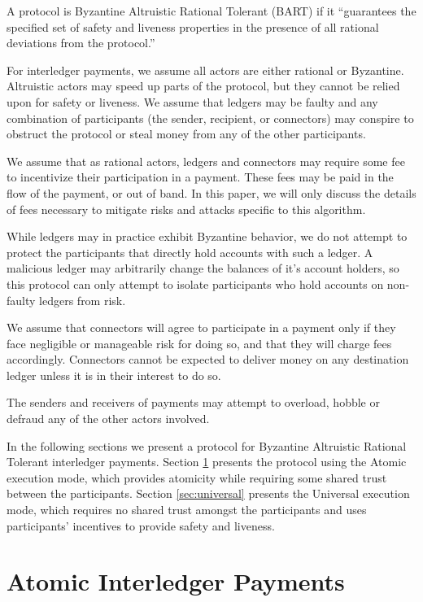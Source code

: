 \documentclass[letterpaper,twocolumn,10pt]{article}
\begin{document}
A protocol is Byzantine Altruistic Rational Tolerant (BART) if it ``guarantees the specified set of safety and liveness properties in the presence of all rational deviations from the protocol.''\cite[p. 2]{aiyer2005bar}

For interledger payments, we assume all actors are either rational or Byzantine. Altruistic actors may speed up parts of the protocol, but they cannot be relied upon for safety or liveness. We assume that ledgers may be faulty and any combination of participants (the sender, recipient, or connectors) may conspire to obstruct the protocol or steal money from any of the other participants. 

We assume that as rational actors, ledgers and connectors may require some fee to incentivize their participation in a payment. These fees may be paid in the flow of the payment, or out of band. In this paper, we will only discuss the details of fees necessary to mitigate risks and attacks specific to this algorithm.

While ledgers may in practice exhibit Byzantine behavior, we do not attempt to protect the participants that directly hold accounts with such a ledger. A malicious ledger may arbitrarily change the balances of it's account holders, so this protocol can only attempt to isolate participants who hold accounts on non-faulty ledgers from risk.

We assume that connectors will agree to participate in a payment only if they face negligible or manageable risk for doing so, and that they will charge fees accordingly. Connectors cannot be expected to deliver money on any destination ledger unless it is in their interest to do so.

The senders and receivers of payments may attempt to overload, hobble or defraud any of the other actors involved.

In the following sections we present a protocol for Byzantine Altruistic Rational Tolerant interledger payments. Section \ref{sec:atomic} presents the protocol using the Atomic execution mode, which provides atomicity while requiring some shared trust between the participants. Section \ref{sec:universal} presents the Universal execution mode, which requires no shared trust amongst the participants and uses participants' incentives to provide safety and liveness.

\section{Atomic Interledger Payments}
\label{sec:atomic}
\end{document}
